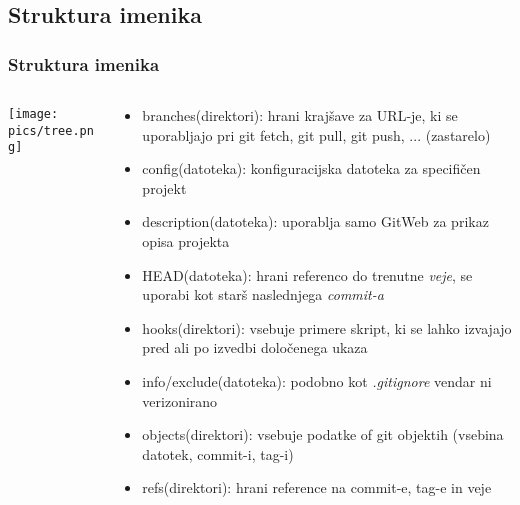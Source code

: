 \documentclass{beamer}
\begin{document}
\subsection{Struktura imenika}
\begin{frame}[shrink=28]
  \frametitle{Struktura imenika}
  \begin{columns}[c]
    \begin{column}{.5\textwidth}
      \texttt{[image: pics/tree.png]}
    \end{column}
    \begin{column}{.5\textwidth}
      \begin{itemize}
        \item branches(direktori): hrani krajšave za URL-je, ki se uporabljajo
          pri git fetch, git pull, git push, ... (zastarelo)
        \item config(datoteka): konfiguracijska datoteka za specifičen projekt
        \item description(datoteka): uporablja samo GitWeb za prikaz opisa projekta
        \item HEAD(datoteka): hrani referenco do trenutne \emph{veje}, se
          uporabi kot starš naslednjega \emph{commit-a}
        \item hooks(direktori): vsebuje primere skript, ki se lahko izvajajo
          pred ali po izvedbi določenega ukaza
        \item info/exclude(datoteka): podobno kot \emph{.gitignore} vendar ni verizonirano
        \item objects(direktori): vsebuje podatke of git objektih (vsebina
          datotek, commit-i, tag-i)
        \item refs(direktori): hrani reference na commit-e, tag-e in veje
      \end{itemize}
    \end{column}
  \end{columns}
\end{frame}
\end{document}
